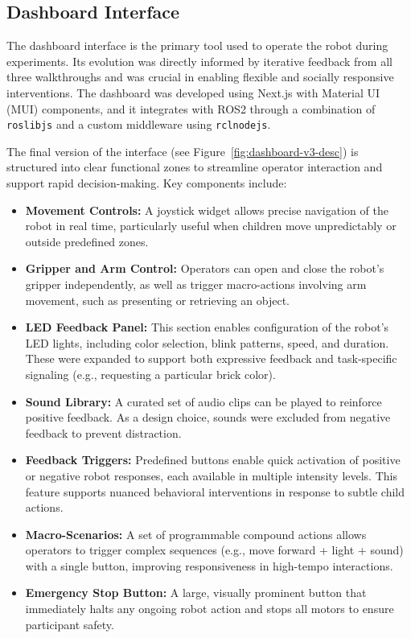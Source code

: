 \documentclass[a4paper]{usiinfbachelorproject}
\begin{document}
\subsection{\textbf{Dashboard Interface}}

The dashboard interface is the primary tool used to operate the robot during experiments.
Its evolution was directly informed by iterative feedback from all three walkthroughs and was crucial in enabling flexible and socially responsive interventions.
The dashboard was developed using Next.js with Material UI (MUI) components, and it integrates with ROS2 through a combination of \texttt{roslibjs} and a custom middleware using \texttt{rclnodejs}.

The final version of the interface (see Figure~\ref{fig:dashboard-v3-desc}) is structured into clear functional zones to streamline operator interaction and support rapid decision-making.
Key components include:

\begin{itemize}
    \item \textbf{Movement Controls:} A joystick widget allows precise navigation of the robot in real time, particularly useful when children move unpredictably or outside predefined zones.
    \item \textbf{Gripper and Arm Control:} Operators can open and close the robot's gripper independently, as well as trigger macro-actions involving arm movement, such as presenting or retrieving an object.
    \item \textbf{LED Feedback Panel:} This section enables configuration of the robot's LED lights, including color selection, blink patterns, speed, and duration. These were expanded to support both expressive feedback and task-specific signaling (e.g., requesting a particular brick color).
    \item \textbf{Sound Library:} A curated set of audio clips can be played to reinforce positive feedback. As a design choice, sounds were excluded from negative feedback to prevent distraction.
    \item \textbf{Feedback Triggers:} Predefined buttons enable quick activation of positive or negative robot responses, each available in multiple intensity levels. This feature supports nuanced behavioral interventions in response to subtle child actions.
    \item \textbf{Macro-Scenarios:} A set of programmable compound actions allows operators to trigger complex sequences (e.g., move forward + light + sound) with a single button, improving responsiveness in high-tempo interactions.
    \item \textbf{Emergency Stop Button:} A large, visually prominent button that immediately halts any ongoing robot action and stops all motors to ensure participant safety.\end{itemize}
\end{document}
